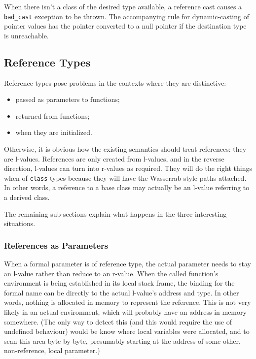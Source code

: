 \documentclass[11pt]{article}
\begin{document}
When there isn't a class of the desired type available, a reference
cast causes a \texttt{bad_cast} exception to be thrown.  The
accompanying rule for dynamic-casting of pointer values has the
pointer converted to a null pointer if the destination type is unreachable.


\subsection{Reference Types}
\label{sec:reftypes}

Reference types pose problems in the contexts where they are
distinctive:
\begin{itemize}
\item passed as parameters to functions;
\item returned from functions;
\item when they are initialized.
\end{itemize}

Otherwise, it is obvious how the existing semantics should treat
references: they are l-values.  References are only created from
l-values, and in the reverse direction, l-values can turn into
r-values as required.  They will do the right things when of
\texttt{class} types because they will have the Wasserrab style paths
attached.  In other words, a reference to a base class may actually be
an l-value referring to a derived class.

The remaining sub-sections explain what happens in the three
interesting situations.



\subsubsection{References as Parameters}

When a formal parameter is of reference type, the actual parameter
needs to stay an l-value rather than reduce to an r-value.  When the
called function's environment is being established in its local stack
frame, the binding for the formal name can be directly to the actual
l-value's address and type.  In other words, nothing is allocated in
memory to represent the reference.  This is not very likely in an
actual environment, which will probably have an address in memory
somewhere.  (The only way to detect this (and this would require the
use of undefined behaviour) would be know where local variables were
allocated, and to scan this area byte-by-byte, presumably starting at
the address of some other, non-reference, local parameter.)
\end{document}
